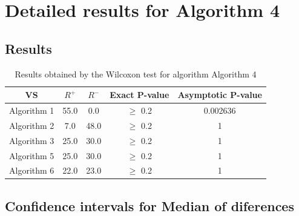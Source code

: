 \documentclass[a4paper,10pt]{article}
\begin{document}
 \clearpage 


\section{Detailed results for Algorithm 4}


\subsection{Results}

\begin{table}[!htp]
\centering\small
\begin{tabular}{
|c|c|c|c|c|}
\hline
 VS & $R^{+}$ & $R^{-}$ & Exact P-value & Asymptotic P-value \\ \hline 
Algorithm 1 & 55.0 & 0.0 & $\geq$ 0.2 & 0.002636\\ \hline 
Algorithm 2 & 7.0 & 48.0 & $\geq$ 0.2 & 1\\ \hline 
Algorithm 3 & 25.0 & 30.0 & $\geq$ 0.2 & 1\\ \hline 
Algorithm 5 & 25.0 & 30.0 & $\geq$ 0.2 & 1\\ \hline 
Algorithm 6 & 22.0 & 23.0 & $\geq$ 0.2 & 1\\ \hline 

\end{tabular}
\caption{Results obtained by the Wilcoxon test for algorithm Algorithm 4}
\end{table}

\subsection{Confidence intervals for Median of diferences}
\end{document}
